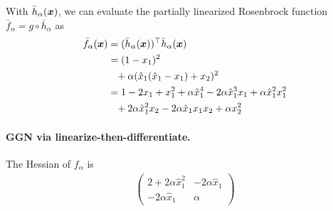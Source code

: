\begin{example}
  With $\bar{h}_{\alpha}({\bm{x}})$, we can evaluate the partially linearized Rosenbrock function $\bar{f}_{\alpha} = g \circ \bar{h}_{\alpha}$ as
  \begin{align*}
    \bar{f}_{\alpha}({\bm{x}})
    &=
      (\bar{h}_{\alpha}({\bm{x}}))^{\top} \bar{h}_{\alpha}({\bm{x}})
    \\
    &=
      (1 - x_1)^2
      \\
    &\phantom{= }+
      \alpha (\hat{x}_1 (\hat{x}_1 - x_1) +  x_2 )^2
    \\
    &= 1 - 2x_1 + x_1^2 + \alpha \hat{x}_1^4 - 2 \alpha \hat{x}_1^3 x_1 + \alpha \hat{x}_1^2 x_1^2
    \\
    &\phantom{= }+ 2 \alpha \hat{x}_1^2 x_2 - 2 \alpha \hat{x}_1 x_1 x_2 + \alpha x_2^2
  \end{align*}

  \paragraph{GGN via linearize-then-differentiate.}
  The Hessian of $f_{\alpha}$ is
  \begin{align*}
    \begin{pmatrix}
      2 + 2 \alpha \hat{x}_1^2 & -2 \alpha \hat{x}_1
      \\
      -2 \alpha \hat{x}_1 & \alpha
    \end{pmatrix}
  \end{align*}



\end{example}
